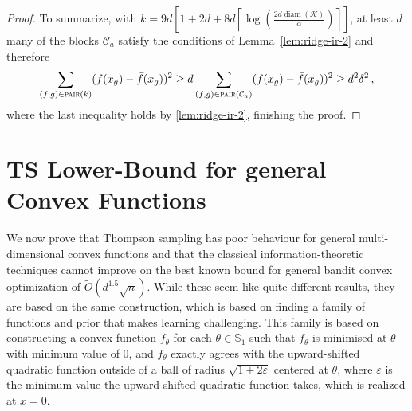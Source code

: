 \documentclass[letter, 12pt]{report}
\newcommand{\ceil}[1]{\left\lceil #1 \right\rceil}
\newcommand{\pair}{\operatorname{\textsc{pair}}}
\newcommand{\sphere}{\mathbb{S}}
\newcommand{\cK}{\mathcal K}
\newcommand{\cC}{\mathcal C}
\newcommand{\diam}{\operatorname{diam}}
\newcommand{\1}{\mathbf{1}}
\newcommand{\ts}{\textsc{TS}\xspace}
\renewcommand{\epsilon}{\varepsilon}
\theoremstyle{plain}
\theoremstyle{definition}
\theoremstyle{remark}
\begin{document}
\begin{proof}
    To summarize, with $k = 9d\left[1 + 2d + 8d\ceil{\log\left(\frac{2d \diam(\cK)}{\alpha}\right)}\right]$,
    at least $d$ many of the blocks $\cC_a$ satisfy the conditions of Lemma~\ref{lem:ridge-ir-2} and therefore
    \begin{align*}
        \sum_{(f,g) \in \pair(k)} (f(x_g) - \bar f(x_g))^2
        \geq d \sum_{(f,g) \in \pair(\cC_a)} (f(x_g) - \bar f(x_g))^2
        \geq d^2 \delta^2\,,
    \end{align*}
    where the last inequality holds by \cref{lem:ridge-ir-2}, finishing the proof.
\end{proof}

\chapter{\ts Lower-Bound for general Convex Functions}
\label{chp:ts-lower-proof}
We now prove that
Thompson sampling has poor behaviour for general multi-dimensional convex functions and
that the classical information-theoretic techniques cannot improve on the best known bound for general bandit convex optimization
of $\tilde O(d^{1.5} \sqrt{n})$. While these seem like quite different results, they are based on the same construction, which is
based on finding a family of functions and prior that makes learning challenging.
This family is based on constructing a convex function $f_\theta$ for each $\theta \in \sphere_1$ such that $f_\theta$ is minimised at $\theta$ with minimum value of $0$, and $f_\theta$ exactly agrees with the upward-shifted quadratic function outside of a ball of radius $\sqrt{1 + 2\epsilon}$ centered at $\theta$, where $\epsilon$ is the minimum value the upward-shifted quadratic function takes, which is realized at $x=0$.
\end{document}
